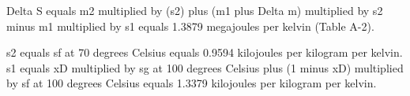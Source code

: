 Delta S equals m2 multiplied by (s2) plus (m1 plus Delta m) multiplied by s2 minus m1 multiplied by s1 equals 1.3879 megajoules per kelvin (Table A-2).  

s2 equals sf at 70 degrees Celsius equals 0.9594 kilojoules per kilogram per kelvin.  
s1 equals xD multiplied by sg at 100 degrees Celsius plus (1 minus xD) multiplied by sf at 100 degrees Celsius equals 1.3379 kilojoules per kilogram per kelvin.